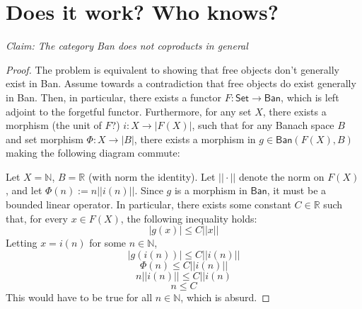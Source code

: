 \documentclass{article}
\newcommand{\R}{\mathbb{R}}
\newcommand{\N}{\mathbb{N}}
\begin{document}
\section{Does it work?  Who knows?}
	\textit{Claim:
		The category \textsf{Ban} does not coproducts in general}
\begin{proof}
	The problem is equivalent to showing that free objects don't generally exist in \textsf{Ban}.  Assume towards a contradiction that free objects do exist generally in \textsf{Ban}.  Then, in particular, there exists a functor $F: \textsf{Set}\rightarrow\textsf{Ban}$, which is left adjoint to the forgetful functor.  Furthermore, for any set $X$, there exists a morphism (the unit of $F$?) $i: X\rightarrow |F(X)|$, such that for any Banach space $B$ and set morphism $\Phi: X\rightarrow|B|$, there exists a morphism in $g\in\textsf{Ban}(F(X),B)$ making the following diagram commute:
	\begin{center}
	\end{center}
Let $X=\N$, $B=\R$ (with norm the identity).  Let $||\cdot||$ denote the norm on $F(X)$, and let $\Phi(n) := n||i(n)||$.  Since $g$ is a morphism in $\textsf{Ban}$, it must be a bounded linear operator.  In particular, there exists some constant $C\in\R$ such that, for every $x\in F(X)$, the following inequality holds: $$|g(x)|\leq C||x||$$Letting $x=i(n)$ for some $n\in\N$, $$|g(i(n))|\leq C||i(n)||$$
$$\Phi(n)\leq C||i(n)||$$
$$n||i(n)||\leq C||i(n)$$
$$n\leq C$$This would have to be true for all $n\in\N$, which is absurd.
\end{proof}
\end{document}

